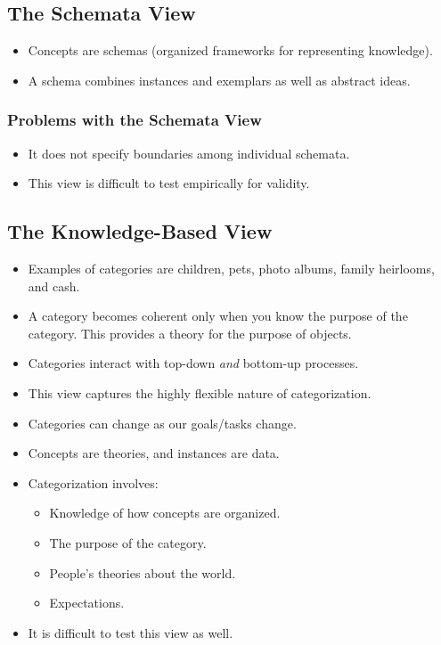 \documentclass[]{article}
\newcommand{\lecture}[1]{\marginpar{{\footnotesize $\leftarrow$ \underline{#1}}}}
\begin{document}
		\subsection{The Schemata View} \lecture{February 28, 2013}
			\begin{itemize}
				\item Concepts are schemas (organized frameworks for representing knowledge).
				\item A schema combines instances and exemplars as well as abstract ideas.
			\end{itemize}
			\subsubsection{Problems with the Schemata View}
				\begin{itemize}
					\item It does not specify boundaries among individual schemata.
					\item This view is difficult to test empirically for validity.
				\end{itemize}
		\subsection{The Knowledge-Based View}
			\begin{itemize}
				\item Examples of categories are children, pets, photo albums, family heirlooms, and cash.
				\item A category becomes coherent only when you know the purpose of the category. This provides a theory for the purpose of objects.
				\item Categories interact with top-down \emph{and} bottom-up processes.
				\item This view captures the highly flexible nature of categorization.
				\item Categories can change as our goals/tasks change.
				\item Concepts are theories, and instances are data.
				\item Categorization involves:
					\begin{itemize}
						\item Knowledge of how concepts are organized.
						\item The purpose of the category.
						\item People's theories about the world.
						\item Expectations.
					\end{itemize}
				\item It is difficult to test this view as well.
			\end{itemize}
\end{document}
